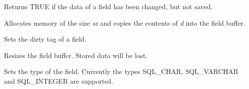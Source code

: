 

Returns TRUE if the data of a field has been changed, but not saved.



Allocates memory of the size {\it sz} and copies the contents of {\it d} into the
field buffer.
  


Sets the dirty tag of a field.



Resizes the field buffer. Stored data will be lost.
  


Sets the type of the field. Currently the types SQL\_CHAR, SQL\_VARCHAR and
SQL\_INTEGER are supported.

